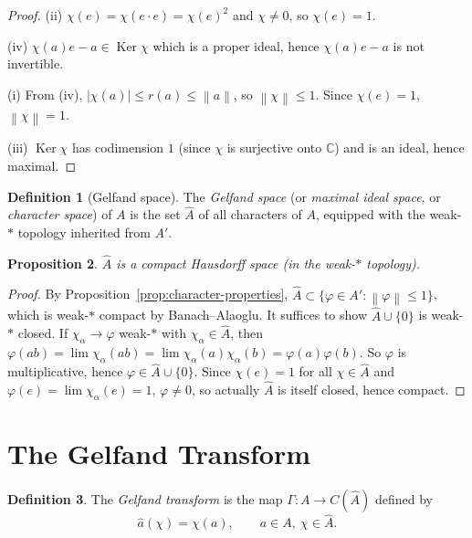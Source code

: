 \documentclass[a4paper,12pt]{book}
\DeclareMathOperator{\Ker}{Ker}
\newcommand{\C}{\mathbb{C}}
\newcommand{\norm}[1]{\left\| #1 \right\|}
\newcommand{\abs}[1]{\left| #1 \right|}
\theoremstyle{definition}
\newtheorem{definition}{Definition}[chapter]
\theoremstyle{plain}
\newtheorem{proposition}[definition]{Proposition}
\theoremstyle{remark}
\begin{document}
\begin{proof}
(ii) $\chi(e) = \chi(e \cdot e) = \chi(e)^2$ and $\chi \ne 0$, so $\chi(e) = 1$.

(iv) $\chi(a) e - a \in \Ker\chi$ which is a proper ideal, hence
$\chi(a)e - a$ is not invertible.

(i) From (iv), $\abs{\chi(a)} \le r(a) \le \norm{a}$, so $\norm{\chi} \le 1$.
Since $\chi(e) = 1$, $\norm{\chi} = 1$.

(iii) $\Ker\chi$ has codimension $1$ (since $\chi$ is surjective onto $\C$) and
is an ideal, hence maximal.
\end{proof}

\begin{definition}[Gelfand space]\label{def:gelfand-space}
The \emph{Gelfand space} (or \emph{maximal ideal space}, or \emph{character space})
of $A$ is the set $\hat{A}$ of all characters of $A$, equipped with the weak-$*$
topology inherited from $A'$.
\end{definition}

\begin{proposition}\label{prop:gelfand-space-compact}
$\hat{A}$ is a compact Hausdorff space (in the weak-$*$ topology).
\end{proposition}

\begin{proof}
By Proposition~\ref{prop:character-properties}, $\hat{A} \subset \{\varphi \in A' :
\norm{\varphi} \le 1\}$, which is weak-$*$ compact by Banach--Alaoglu.
It suffices to show $\hat{A} \cup \{0\}$ is weak-$*$ closed. If
$\chi_\alpha \to \varphi$ weak-$*$ with $\chi_\alpha \in \hat{A}$, then
$\varphi(ab) = \lim \chi_\alpha(ab) = \lim \chi_\alpha(a)\chi_\alpha(b) = \varphi(a)\varphi(b)$.
So $\varphi$ is multiplicative, hence $\varphi \in \hat{A} \cup \{0\}$. Since
$\chi(e) = 1$ for all $\chi \in \hat{A}$ and $\varphi(e) = \lim \chi_\alpha(e) = 1$,
$\varphi \ne 0$, so actually $\hat{A}$ is itself closed, hence compact.
\end{proof}

\section{The Gelfand Transform}\label{sec:gelfand-transform}


\begin{definition}\label{def:gelfand-transform}
The \emph{Gelfand transform} is the map
$\Gamma \colon A \to C(\hat{A})$ defined by
\[
  \hat{a}(\chi) = \chi(a), \qquad a \in A,\ \chi \in \hat{A}.
\]
\end{definition}
\end{document}
